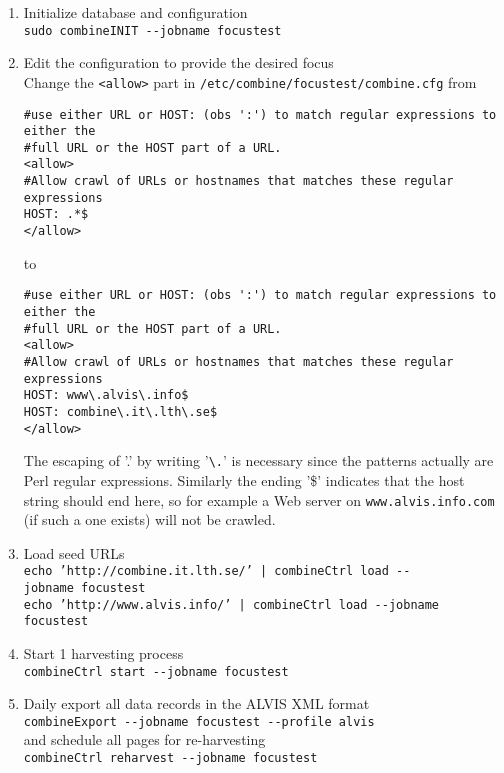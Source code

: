 \begin{enumerate}
\item    Initialize database and configuration\\
{\tt  sudo combineINIT \verb+--+jobname focustest}

\item Edit the configuration to provide the desired focus\\
Change the {\tt <allow>} part in {\tt /etc/combine/focustest/combine.cfg} from\\
\begin{verbatim}
#use either URL or HOST: (obs ':') to match regular expressions to either the
#full URL or the HOST part of a URL.
<allow>
#Allow crawl of URLs or hostnames that matches these regular expressions
HOST: .*$
</allow>
\end{verbatim}
to\\
\begin{verbatim}
#use either URL or HOST: (obs ':') to match regular expressions to either the
#full URL or the HOST part of a URL.
<allow>
#Allow crawl of URLs or hostnames that matches these regular expressions
HOST: www\.alvis\.info$
HOST: combine\.it\.lth\.se$
</allow>
\end{verbatim}
The escaping of '.' by writing '\verb+\.+' is necessary since the patterns
actually are Perl regular expressions. Similarly the ending '\$'
indicates that the host string should end here, so for example
a Web server on {\tt www.alvis.info.com} (if such a one exists) will
not be crawled.

\item Load seed URLs\\
{\tt  echo 'http://combine.it.lth.se/' | combineCtrl  load \verb+--+jobname~focustest}\\
{\tt  echo 'http://www.alvis.info/' | combineCtrl  load \verb+--+jobname focustest}

\item  Start 1 harvesting process\\
{\tt  combineCtrl  start \verb+--+jobname focustest}

\item  Daily export all data records in the ALVIS XML format\\
{\tt  combineExport \verb+--+jobname focustest \verb+--+profile alvis}\\
and schedule all pages for re-harvesting\\
{\tt combineCtrl reharvest \verb+--+jobname focustest}
\end{enumerate}



